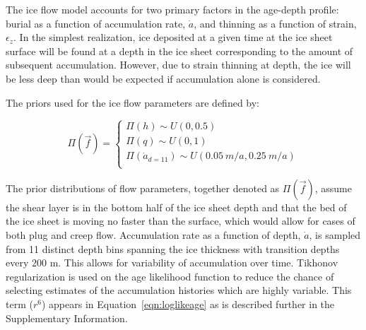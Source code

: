 The ice flow model accounts for two primary factors in the age-depth profile: burial as a function of accumulation rate, $\dot{a}$, and thinning as a function of strain, $\epsilon_z$. In the simplest realization, ice deposited at a given time at the ice sheet surface will be found at a depth in the ice sheet corresponding to the amount of subsequent accumulation. However, due to strain thinning at depth, the ice will be less deep than would be expected if accumulation alone is considered. 


The priors used for the ice flow parameters are defined by:

\begin{center}
\begin{equation}\label{priors}
\Pi(\vec{f}) = 
\begin{cases}
\Pi(h) \sim U(0, 0.5) \\
\Pi(q) \sim U (0, 1) \\
\Pi(\dot{a}_{d=11}) \sim U(0.05~m/a,0.25~m/a)\\
\end{cases}	
\end{equation}	
\end{center}

The prior distributions of flow parameters, together denoted as $\Pi(\vec{f})$, assume the shear layer is in the bottom half of the ice sheet depth \citep{cuffey2010} and that the bed of the ice sheet is moving no faster than the surface, which would allow for cases of both plug and creep flow. Accumulation rate as a function of depth, $\dot{a}$, is sampled from 11 distinct depth bins spanning the ice thickness with transition depths every 200 m. This allows for variability of accumulation over time. Tikhonov regularization is used on the age likelihood function to reduce the chance of selecting estimates of the accumulation histories which are highly variable. This term ($r^6$) appears in Equation~\ref{eqn:loglikeage} as is described further in the Supplementary Information.
